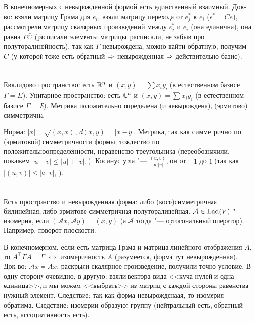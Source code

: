 В конечномерных с невырожденной формой есть единственный взаимный.
Док-во: взяли матрицу Грама для $e_i$, взяли матрицу перехода от $e_j^*$ к $e_i$ ($e^*=Ce$), рассмотрели
матрицу скалярных произведений между $e_j^*$ и $e_i$ (она единична), она равна $\Gamma \bar C$ (расписали элементы матрицы, расписали, не забыв про полуторалинейность),
так как $\Gamma$ невырождена, можно найти обратную, получим $C$ (у которой тоже есть обратный $\Rightarrow$ невырожденная $\Rightarrow$ действительно базис).

\section{} %
Евклидово пространство: есть $\mathbb{R}^n$ и $(x, y) = \sum x_iy_i$ (в естественном базисе $\Gamma=E$).
Унитарное пространство: есть $\mathbb{C}^n$ и $(x, y) = \sum x_i\bar y_i$ (в естественном базисе $\Gamma=E$).
Метрика положительно определена (и невырождена), (эрмитово) симметрична.

Норма: $|x|=\sqrt{(x,x)}$, $d(x, y)=|x-y|$.
Метрика, так как симметрично по (эрмитовой) симметричности формы, тождество по положительноопределённости,
неравенство треугольника (переобозначили, покажем $|u+v|\le|u|+|v|$, \TODO).
Косинус угла "--- $\frac{(u,v)}{|u||v|}$, он от $-1$ до $1$ (так как $|(u, v)| \le |u||v|$, \TODO).

\section{} %
Есть пространство и невырожденная форма: либо (косо)симметричная билинейная, либо эрмитово симметричная полуторалинейная.
$\mathcal{A} \in \operatorname{End}(V)$ "--- изомерия, если $(\mathcal{A}x, \mathcal{A}y) = (x, y)$ (а $\mathcal{A}$ тогда "--- ортогональный оператор).
Например, поворот плоскости.

В конечномерном, если есть матрица Грама и матрица линейного отображения $A$, то $A^\top \Gamma \bar A = \Gamma$ $\iff$ изомеричность $A$ (разумеется, форма тут невырожденная).
Док-во: $\mathcal{A} x = Ax$, раскрыли скалярное произведение, получили точно условие.
В одну сторону очевидно, в другую: взяли вектора вида <<куча нулей и одна единица>>, и мы можем <<выбрать>> из матриц с каждой стороны равенства нужный элемент.
Следствие: так как форма невырожденаая, то изомерия обратима.
Следствие: изомерии образуют группу (нейтральный есть, обратный есть, ассоциативность есть).

